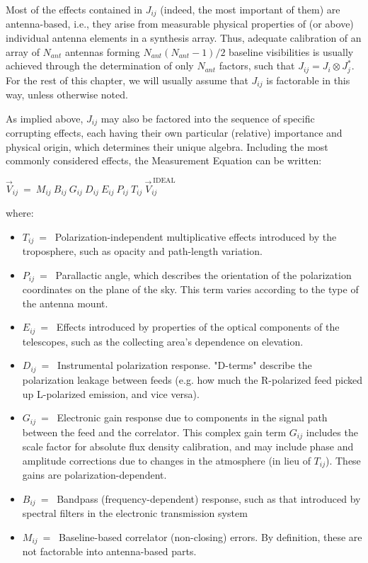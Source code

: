 Most of the effects contained in $J_{ij}$ (indeed, the most important
of them) are antenna-based, i.e., they arise from measurable physical
properties of (or above) individual antenna elements in a synthesis
array. Thus, adequate calibration of an array of $N_{ant}$ antennas
forming $N_{ant}(N_{ant}-1)/2$ baseline visibilities is usually
achieved through the determination of only $N_{ant}$ factors, such
that $J_{ij} = J_i \otimes J_j^{*}$. For the rest of this chapter, we
will usually assume that $J_{ij}$ is factorable in this way, unless
otherwise noted. 

As implied above, $J_{ij}$ may also be factored into the sequence of
specific corrupting effects, each having their own particular
(relative) importance and physical origin, which determines their
unique algebra. Including the most commonly considered effects, the
Measurement Equation can be written: 

$\vec{V}_{ij}~=~M_{ij}~B_{ij}~G_{ij}~D_{ij}~E_{ij}~P_{ij}~T_{ij}~\vec{V}_{ij}^{\mathrm{~IDEAL}}$   

where:

\begin{itemize}
   \item $T_{ij}~=~$ Polarization-independent multiplicative effects
     introduced by the troposphere, such as opacity and path-length
     variation. 
   \item  $P_{ij}~=~$ Parallactic angle, which describes the
     orientation of the polarization coordinates on the plane of the
     sky. This term varies according to the type of the antenna mount. 
   \item  $E_{ij}~=~$ Effects introduced by properties of the optical
     components of the telescopes, such as the collecting area's
     dependence on elevation. 
   \item  $D_{ij}~=~$ Instrumental polarization response. "D-terms"
     describe the polarization leakage between feeds (e.g. how much the
     R-polarized feed picked up L-polarized emission, and vice versa). 
   \item  $G_{ij}~=~$ Electronic gain response due to components in
     the signal path between the feed and the correlator. This complex
     gain term $G_{ij}$ includes the scale factor for absolute flux
     density calibration, and may include phase and amplitude
     corrections due to changes in the atmosphere (in lieu of
     $T_{ij}$). These gains are polarization-dependent. 
   \item  $B_{ij}~=~$ Bandpass (frequency-dependent) response, such as
     that introduced by spectral filters in the electronic transmission
     system 
   \item  $M_{ij}~=~$ Baseline-based correlator (non-closing)
     errors. By definition, these are not factorable into antenna-based
     parts.  
\end{itemize}

